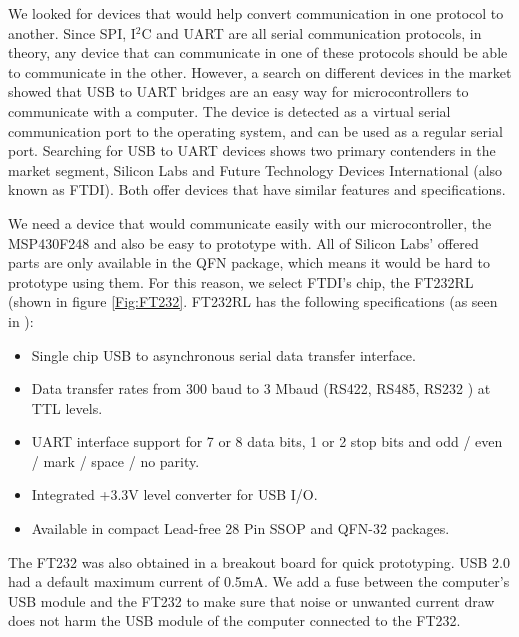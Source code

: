 We looked for devices that would help convert communication in one protocol to another. Since SPI, I$^2$C and UART are all serial communication protocols, in theory, any device that can communicate in one of these protocols should be able to communicate in the other. However, a search on different devices in the market showed that USB to UART bridges are an easy way for microcontrollers to communicate with a computer. The device is detected as a virtual serial communication port to the operating system, and can be used as a regular serial port. Searching for USB to UART devices shows two primary contenders in the market segment, Silicon Labs and Future Technology Devices International (also known as FTDI). Both offer devices that have similar features and specifications. 

We need a device that would communicate easily with our microcontroller, the MSP430F248 and also be easy to prototype with. All of Silicon Labs' offered parts are only available in the QFN package, which means it would be hard to prototype using them. For this reason, we select FTDI's chip, the FT232RL (shown in figure \ref{Fig:FT232}. FT232RL has the following specifications (as seen in \cite{FT232Datasheet}):

\begin{itemize}
	\item Single chip USB to asynchronous serial data transfer interface.
	\item Data transfer rates from 300 baud to 3 Mbaud (RS422, RS485, RS232 ) at TTL levels.
	\item UART interface support for 7 or 8 data bits, 1 or 2 stop bits and odd / even / mark / space / no parity.
	\item Integrated +3.3V level converter for USB I/O.
	\item Available in compact Lead-free 28 Pin SSOP and QFN-32 packages.
\end{itemize}

The FT232 was also obtained in a breakout board for quick prototyping.
USB 2.0 had a default maximum current of 0.5mA. We add a fuse between the computer's USB module and the FT232 to make sure that noise or unwanted current draw does not harm the USB module of the computer connected to the FT232.


